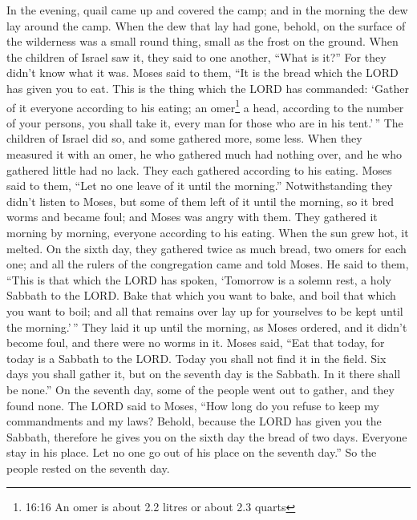  In the evening, quail came up and covered the camp; and in
the morning the dew lay around the camp.  When the dew that
lay had gone, behold, on the surface of the wilderness was a small round
thing, small as the frost on the ground.  When the children
of Israel saw it, they said to one another, ``What is it?'' For they
didn't know what it was. Moses said to them, ``It is the bread which the
LORD has given you to eat.  This is the thing which the
LORD has commanded: `Gather of it everyone according to his eating; an
omer\footnote{16:16 An omer is about 2.2 litres or about 2.3 quarts} a
head, according to the number of your persons, you shall take it, every
man for those who are in his tent.'\,''  The children of
Israel did so, and some gathered more, some less.  When
they measured it with an omer, he who gathered much had nothing over,
and he who gathered little had no lack. They each gathered according to
his eating.  Moses said to them, ``Let no one leave of it
until the morning.''  Notwithstanding they didn't listen to
Moses, but some of them left of it until the morning, so it bred worms
and became foul; and Moses was angry with them.  They
gathered it morning by morning, everyone according to his eating. When
the sun grew hot, it melted.  On the sixth day, they
gathered twice as much bread, two omers for each one; and all the rulers
of the congregation came and told Moses.  He said to them,
``This is that which the LORD has spoken, `Tomorrow is a solemn rest, a
holy Sabbath to the LORD. Bake that which you want to bake, and boil
that which you want to boil; and all that remains over lay up for
yourselves to be kept until the morning.'\,''  They laid it
up until the morning, as Moses ordered, and it didn't become foul, and
there were no worms in it.  Moses said, ``Eat that today,
for today is a Sabbath to the LORD. Today you shall not find it in the
field.  Six days you shall gather it, but on the seventh
day is the Sabbath. In it there shall be none.''  On the
seventh day, some of the people went out to gather, and they found none.
 The LORD said to Moses, ``How long do you refuse to keep
my commandments and my laws?  Behold, because the LORD has
given you the Sabbath, therefore he gives you on the sixth day the bread
of two days. Everyone stay in his place. Let no one go out of his place
on the seventh day.''  So the people rested on the seventh
day.

